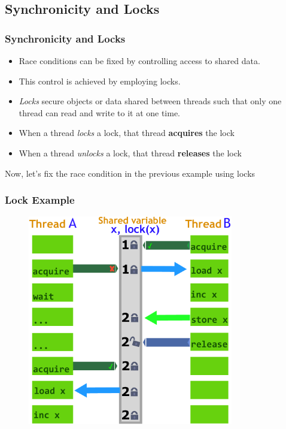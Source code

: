 \documentclass{beamer}
\newcommand{\linespace}{\vskip 0.25cm}
\begin{document}
\subsection[Locks]{Synchronicity and Locks}


\begin{frame}
\frametitle{Synchronicity and Locks}

\begin{itemize}
	\item Race conditions can be fixed by controlling access to shared data.
	\item This control is achieved by employing locks.
	
	\linespace
	
	\item \emph{Locks} secure objects or data shared between threads such that only one thread can read and write to it at one time.

	\linespace

	\item When a thread \emph{locks} a lock, that thread \textbf{acquires} the lock
	\item When a thread \emph{unlocks} a lock, that thread \textbf{releases} the lock
\end{itemize}

Now, let's fix the race condition in the previous example using locks

\end{frame}

\begin{frame}
\frametitle{Lock Example}
	\begin{figure}
		\includegraphics[width=0.8\textwidth]{Illustrations/Lock}
		\label{fig:lock}
	\end{figure}
\end{frame}
\end{document}
